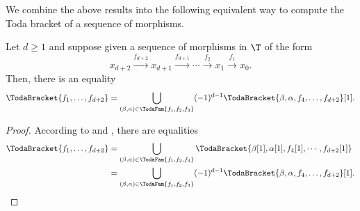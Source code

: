 \documentclass[a4paper]{amsart}
\begin{document}
We combine the above results into the following equivalent way to compute the
Toda bracket of a sequence of morphisms.

\begin{proposition}
  \label{prop:TodaBracket_alt}
  Let $d\geq1$ and suppose given a sequence of morphisms in $\T$ of the form
  \[
    x_{d+2}\xrightarrow{f_{d+2}}x_{d+1}\xrightarrow{f_{d+1}}\cdots\xrightarrow{f_2}x_1\xrightarrow{f_1}x_0.
  \]
  Then, there is an equality
  \[
    \TodaBracket{f_1,\dots,f_{d+2}}=\bigcup_{(\beta,\alpha)\in\TodaFam{f_1,f_2,f_3}}(-1)^{d-1}\TodaBracket{\beta,\alpha,f_4,\dots,f_{d+2}}[1].
  \]
\end{proposition}
\begin{proof}
  According to  and , there
  are equalities
  \begin{align*}
    \TodaBracket{f_1,\dots,f_{d+2}} & =\bigcup_{(\beta,\alpha)\in\TodaFam{f_1,f_2,f_3}}\TodaBracket{\beta[1],\alpha[1],f_4[1],\cdots,f_{d+2}[1]}          \\
                                    & =\bigcup_{(\beta,\alpha)\in\TodaFam{f_1,f_2,f_3}}(-1)^{d-1}\TodaBracket{\beta,\alpha,f_4,\dots,f_{d+2}}[1].\qedhere
  \end{align*}
\end{proof}
\end{document}
